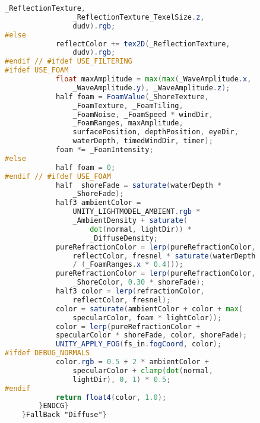 \begin{lstlisting}[language=GLSL, caption={\label{cf:agua} \textit{Shader} de efeito de água na Unity}]
				_ReflectionTexture, 
				_ReflectionTexture_TexelSize.z, 
				dudv).rgb;
#else
			reflectColor += tex2D(_ReflectionTexture, 
				dudv).rgb;
#endif // #ifdef USE_FILTERING
#ifdef USE_FOAM
			float maxAmplitude = max(max(_WaveAmplitude.x, 
				_WaveAmplitude.y), _WaveAmplitude.z);
			half foam = FoamValue(_ShoreTexture, 
				_FoamTexture, _FoamTiling,
				_FoamNoise, _FoamSpeed * windDir, 
				_FoamRanges, maxAmplitude,
				surfacePosition, depthPosition, eyeDir, 
				waterDepth, timedWindDir, timer);
			foam *= _FoamIntensity;
#else
			half foam = 0;
#endif // #ifdef USE_FOAM
			half  shoreFade = saturate(waterDepth * 
				_ShoreFade);
			half3 ambientColor = 
				UNITY_LIGHTMODEL_AMBIENT.rgb * 
				_AmbientDensity + saturate(
					dot(normal, lightDir)) * 
					_DiffuseDensity;
			pureRefractionColor = lerp(pureRefractionColor, 
				reflectColor, fresnel * saturate(waterDepth 
				/ (_FoamRanges.x * 0.4)));
			pureRefractionColor = lerp(pureRefractionColor, 
				_ShoreColor, 0.30 * shoreFade);
			half3 color = lerp(refractionColor, 
				reflectColor, fresnel);
			color = saturate(ambientColor + color + max(
				specularColor, foam * lightColor));
			color = lerp(pureRefractionColor + 
			specularColor * shoreFade, color, shoreFade);
			UNITY_APPLY_FOG(fs_in.fogCoord, color);
#ifdef DEBUG_NORMALS
			color.rgb = 0.5 + 2 * ambientColor + 
				specularColor + clamp(dot(normal, 
				lightDir), 0, 1) * 0.5;
#endif
			return float4(color, 1.0);
		}ENDCG}
	}FallBack "Diffuse"}
\end{lstlisting}

\nocite{alin2021}

